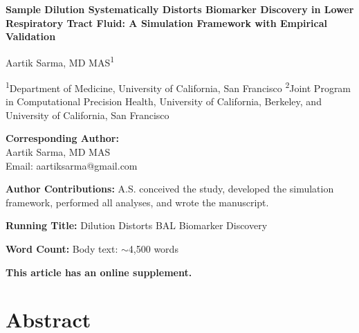 \documentclass[12pt]{article}
\begin{document}
\begin{titlepage}
\begin{center}
\vspace*{2cm}

{\Large\bfseries Sample Dilution Systematically Distorts Biomarker Discovery in Lower Respiratory Tract Fluid: A Simulation Framework with Empirical Validation}

\vspace{1.5cm}

Aartik Sarma, MD MAS\textsuperscript{1}

\vspace{1cm}

\textsuperscript{1}Department of Medicine, University of California, San Francisco
\newline
\textsuperscript{2}Joint Program in Computational Precision Health, University of California, Berkeley, and University of California, San Francisco

\end{center}

\vspace{1.5cm}

\textbf{Corresponding Author:}\\
Aartik Sarma, MD MAS\\
Email: aartiksarma@gmail.com

\vspace{1cm}

\textbf{Author Contributions:} A.S. conceived the study, developed the simulation framework, performed all analyses, and wrote the manuscript.

\vspace{1cm}

\textbf{Running Title:} Dilution Distorts BAL Biomarker Discovery

\vspace{0.5cm}

\textbf{Word Count:} Body text: $\sim$4,500 words

\vspace{0.5cm}

\textbf{This article has an online supplement.}


\end{titlepage}

\section*{Abstract}
\end{document}
